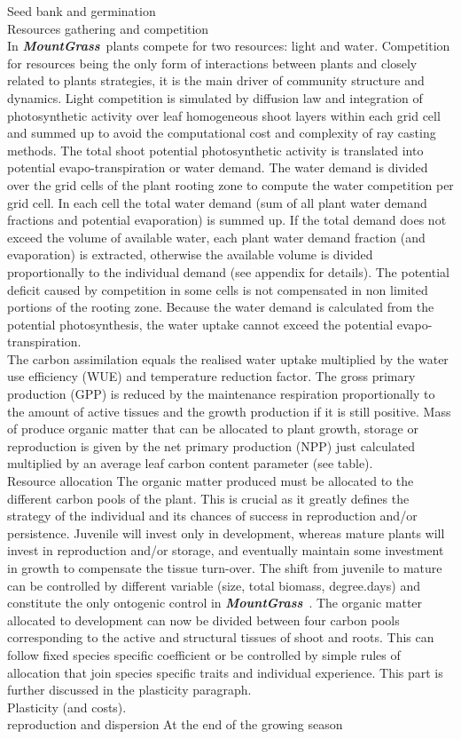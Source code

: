 \documentclass[review]{elsarticle}
\newcommand{\model}{\textbf{\textit{MountGrass}}~}
\begin{document}
Seed bank and germination\\

Resources gathering and competition\\
In \model plants compete for two resources: light and water. Competition for resources being the only form of interactions between plants and closely related to plants strategies, it is the main driver of community structure and dynamics. Light competition is simulated by diffusion law and integration of photosynthetic activity over leaf homogeneous shoot layers within each grid cell and summed up \cite{Taubert} to avoid the computational cost and complexity of ray casting methods. The total shoot potential photosynthetic activity is translated into potential evapo-transpiration or water demand. The water demand is divided over the grid cells of the plant rooting zone to compute the water competition per grid cell. In each cell the total water demand (sum of all plant water demand fractions and potential evaporation) is summed up. If the total demand does not exceed the volume of available water, each plant water demand fraction (and evaporation) is extracted, otherwise the available volume is divided proportionally to the individual demand (see appendix for details). The potential deficit caused by competition in some cells is not compensated in non limited portions of the rooting zone. Because the water demand is calculated from the potential photosynthesis, the water uptake cannot exceed the potential evapo-transpiration.\\
The carbon assimilation equals the realised water uptake multiplied by the water use efficiency (WUE) and temperature reduction factor. The gross primary production (GPP) is reduced by the maintenance respiration proportionally to the amount of active tissues and the growth production if it is still positive. Mass of produce organic matter that can be allocated to plant growth, storage or reproduction is given by the net primary production (NPP) just calculated multiplied by an average leaf carbon content parameter (see table).\\

Resource allocation
The organic matter produced must be allocated to the different carbon pools of the plant. This is crucial as it greatly defines the strategy of the individual and its chances of success in reproduction and/or persistence. Juvenile will invest only in development, whereas mature plants will invest in reproduction and/or storage, and eventually maintain some investment in growth to compensate the tissue turn-over. The shift from juvenile to mature can be controlled by different variable (size, total biomass, degree.days) and constitute the only ontogenic control in \model . The organic matter allocated to development can now be divided between four carbon pools corresponding to the active and structural tissues of shoot and roots. This can follow fixed species specific coefficient or be controlled by simple rules of allocation that join species specific traits and individual experience. This part is further discussed in the plasticity paragraph. \\
Plasticity (and costs).\\
reproduction and dispersion
At the end of the growing season\\
\end{document}
